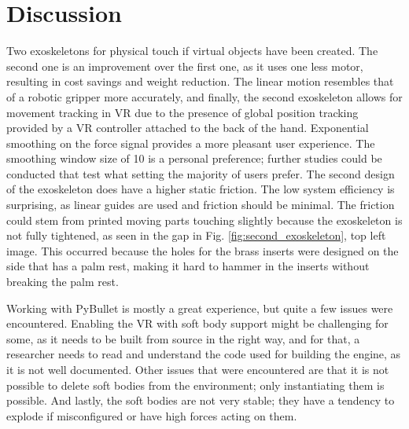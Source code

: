 \chapter{Discussion}
\label{chap:discussion}
Two exoskeletons for physical touch if virtual objects have been created. The second one is an improvement over the first one, as it uses one less motor, resulting in cost savings and weight reduction. The linear motion resembles that of a robotic gripper more accurately, and finally, the second exoskeleton allows for movement tracking in VR due to the presence of global position tracking provided by a VR controller attached to the back of the hand. Exponential smoothing on the force signal provides a more pleasant user experience. The smoothing window size of 10 is a personal preference; further studies could be conducted that test what setting the majority of users prefer. The second design of the exoskeleton does have a higher static friction. The low system efficiency is surprising, as linear guides are used and friction should be minimal. The friction could stem from printed moving parts touching slightly because the exoskeleton is not fully tightened, as seen in the gap in Fig. \ref{fig:second_exoskeleton}, top left image. This occurred because the holes for the brass inserts were designed on the side that has a palm rest, making it hard to hammer in the inserts without breaking the palm rest.

\bigskip \noindent
Working with PyBullet is mostly a great experience, but quite a few issues were encountered. Enabling the VR with soft body support might be challenging for some, as it needs to be built from source in the right way, and for that, a researcher needs to read and understand the code used for building the engine, as it is not well documented. Other issues that were encountered are that it is not possible to delete soft bodies from the environment; only instantiating them is possible. And lastly, the soft bodies are not very stable; they have a tendency to explode if misconfigured or have high forces acting on them.